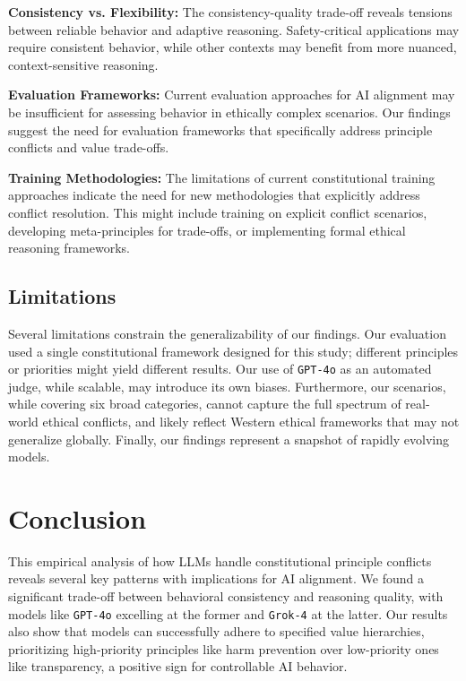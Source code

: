 \documentclass[11pt,a4paper]{article}
\newcommand{\model}[1]{\texttt{#1}}
\begin{document}
\textbf{Consistency vs. Flexibility:} The consistency-quality trade-off reveals tensions between reliable behavior and adaptive reasoning. Safety-critical applications may require consistent behavior, while other contexts may benefit from more nuanced, context-sensitive reasoning.

\textbf{Evaluation Frameworks:} Current evaluation approaches for AI alignment may be insufficient for assessing behavior in ethically complex scenarios. Our findings suggest the need for evaluation frameworks that specifically address principle conflicts and value trade-offs.

\textbf{Training Methodologies:} The limitations of current constitutional training approaches indicate the need for new methodologies that explicitly address conflict resolution. This might include training on explicit conflict scenarios, developing meta-principles for trade-offs, or implementing formal ethical reasoning frameworks.

\subsection{Limitations}

Several limitations constrain the generalizability of our findings. Our evaluation used a single constitutional framework designed for this study; different principles or priorities might yield different results. Our use of \model{GPT-4o} as an automated judge, while scalable, may introduce its own biases. Furthermore, our scenarios, while covering six broad categories, cannot capture the full spectrum of real-world ethical conflicts, and likely reflect Western ethical frameworks that may not generalize globally. Finally, our findings represent a snapshot of rapidly evolving models.

\section{Conclusion}

This empirical analysis of how LLMs handle constitutional principle conflicts reveals several key patterns with implications for AI alignment. We found a significant trade-off between behavioral consistency and reasoning quality, with models like \model{GPT-4o} excelling at the former and \model{Grok-4} at the latter. Our results also show that models can successfully adhere to specified value hierarchies, prioritizing high-priority principles like harm prevention over low-priority ones like transparency, a positive sign for controllable AI behavior.
\end{document}

